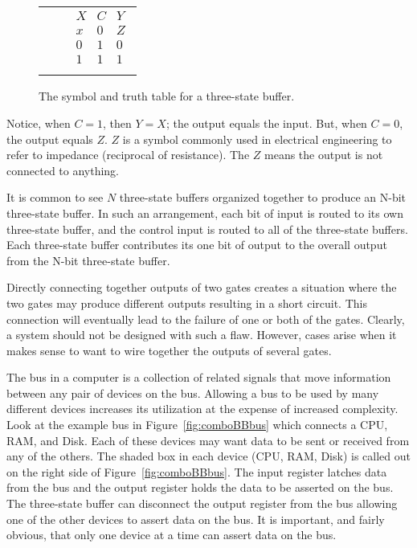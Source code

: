 \begin{figure}[ht]
\begin{tabular}[b]{p{1.0in}p{0.5in}l}
\includegraphics[10mm,10mm][12mm,12mm]{tsb} & &
                                                                                
$\begin{array}{c|c||c}
X & C & Y \\ \hline
x & 0 & Z \\ \hline
0 & 1 & 0 \\ \hline
1 & 1 & 1 \\
\end{array}$
\end{tabular}
\caption{The symbol and truth table for a three-state buffer.}
\label{fig:comboBBtsb}
\end{figure}

Notice, when $C=1$, then $Y=X$; the output equals the
input.  But, when $C=0$, the output equals $Z$.  $Z$ is
a symbol commonly used in electrical engineering
to refer to impedance (reciprocal of resistance).  The
$Z$ means the output is not connected to anything.

It is common to see $N$ three-state buffers organized together to
produce an N-bit three-state buffer.  In such an arrangement, 
each bit of input is routed to its own three-state buffer,
and the control input is routed to all of the three-state 
buffers.  Each three-state buffer contributes its one bit 
of output to the overall output from the N-bit three-state
buffer.
 

Directly connecting together outputs of two gates creates
a situation where the two gates may produce different outputs
resulting in a short circuit.  This connection will
eventually lead to the failure of one or both of the gates.
Clearly, a system should not be designed with such a flaw.
However, cases arise when it makes sense to want to wire
together the outputs of several gates.

The bus  in a computer is a collection
of related signals that move information between any pair
of devices on the bus.  Allowing a bus to be used by many
different devices increases its utilization at the expense 
of increased complexity.  Look at the example bus in 
Figure~\ref{fig:comboBBbus} which connects a CPU, RAM, and Disk.
Each of these devices may want data to be sent or
received from any of the others.  The shaded box in each device 
(CPU, RAM, Disk) is called out on the right side of Figure~\ref{fig:comboBBbus}.
The input register latches data from the bus and the output
register holds the data to be asserted on the bus.  The 
three-state buffer can disconnect the output register from the bus 
allowing one of the other devices to assert data on the bus.  
It is important, and fairly obvious, that only one device at a 
time can assert data on the bus.  

